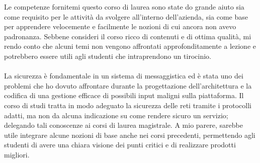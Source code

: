 Le competenze fornitemi questo corso di laurea sono state do grande aiuto sia come requisito per le attività da svolgere all'interno dell'azienda, sia come base per apprendere velocemente e facilmente le nozioni di cui ancora non avevo padronanza. Sebbene consideri il corso ricco di contenuti e di ottima qualità, mi rendo conto che alcuni temi non vengono affrontati approfonditamente a lezione e potrebbero essere utili agli studenti che intraprendono un tirocinio.
\paragraph*{} La sicurezza è fondamentale in un sistema di messaggistica ed è stata uno dei problemi che ho dovuto affrontare durante la progettazione dell'architettura e la codifica di una gestione efficace di possibili input maligni sulla piattaforma. Il corso di studi tratta in modo adeguato la sicurezza delle reti tramite i protocolli adatti, ma non da alcuna indicazione su come rendere sicuro un servizio; delegando tali conoscenze ai corsi di laurea magistrale. A mio parere, sarebbe utile integrare alcune nozioni di base anche nei corsi precedenti, permettendo agli studenti di avere una chiara visione dei punti critici e di realizzare prodotti migliori.
